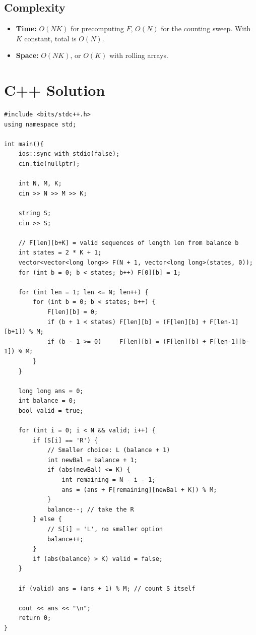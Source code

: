 \documentclass[11pt,a4paper]{article}
\begin{document}
\subsection{Complexity}
\begin{itemize}
    \item \textbf{Time:} $O(NK)$ for precomputing $F$, $O(N)$ for the counting sweep. With $K$ constant, total is $O(N)$.
    \item \textbf{Space:} $O(NK)$, or $O(K)$ with rolling arrays.
\end{itemize}

\section{C++ Solution}

\begin{lstlisting}
#include <bits/stdc++.h>
using namespace std;

int main(){
    ios::sync_with_stdio(false);
    cin.tie(nullptr);

    int N, M, K;
    cin >> N >> M >> K;

    string S;
    cin >> S;

    // F[len][b+K] = valid sequences of length len from balance b
    int states = 2 * K + 1;
    vector<vector<long long>> F(N + 1, vector<long long>(states, 0));
    for (int b = 0; b < states; b++) F[0][b] = 1;

    for (int len = 1; len <= N; len++) {
        for (int b = 0; b < states; b++) {
            F[len][b] = 0;
            if (b + 1 < states) F[len][b] = (F[len][b] + F[len-1][b+1]) % M;
            if (b - 1 >= 0)     F[len][b] = (F[len][b] + F[len-1][b-1]) % M;
        }
    }

    long long ans = 0;
    int balance = 0;
    bool valid = true;

    for (int i = 0; i < N && valid; i++) {
        if (S[i] == 'R') {
            // Smaller choice: L (balance + 1)
            int newBal = balance + 1;
            if (abs(newBal) <= K) {
                int remaining = N - i - 1;
                ans = (ans + F[remaining][newBal + K]) % M;
            }
            balance--; // take the R
        } else {
            // S[i] = 'L', no smaller option
            balance++;
        }
        if (abs(balance) > K) valid = false;
    }

    if (valid) ans = (ans + 1) % M; // count S itself

    cout << ans << "\n";
    return 0;
}
\end{lstlisting}
\end{document}
